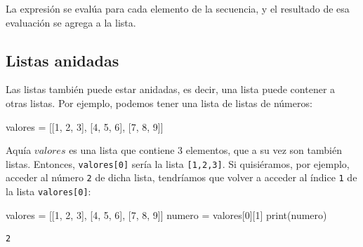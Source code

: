 \documentclass[
  letterpaper,
  DIV=11,
  numbers=noendperiod]{scrreprt}
\newenvironment{Shaded}{\begin{snugshade}}{\end{snugshade}}
\newcommand{\BuiltInTok}[1]{\textcolor[rgb]{0.00,0.23,0.31}{#1}}
\newcommand{\DecValTok}[1]{\textcolor[rgb]{0.68,0.00,0.00}{#1}}
\newcommand{\NormalTok}[1]{\textcolor[rgb]{0.00,0.23,0.31}{#1}}
\newcommand{\OperatorTok}[1]{\textcolor[rgb]{0.37,0.37,0.37}{#1}}
\begin{document}
La expresión se evalúa para cada elemento de la secuencia, y el
resultado de esa evaluación se agrega a la lista.

\hypertarget{listas-anidadas}{%
\subsection{Listas anidadas}\label{listas-anidadas}}

Las listas también puede estar anidadas, es decir, una lista puede
contener a otras listas. Por ejemplo, podemos tener una lista de listas
de números:

\begin{Shaded}
\begin{Highlighting}[]
\NormalTok{valores }\OperatorTok{=}\NormalTok{ [[}\DecValTok{1}\NormalTok{, }\DecValTok{2}\NormalTok{, }\DecValTok{3}\NormalTok{], [}\DecValTok{4}\NormalTok{, }\DecValTok{5}\NormalTok{, }\DecValTok{6}\NormalTok{], [}\DecValTok{7}\NormalTok{, }\DecValTok{8}\NormalTok{, }\DecValTok{9}\NormalTok{]]}
\end{Highlighting}
\end{Shaded}

Aquía \(valores\) es una lista que contiene 3 elementos, que a su vez
son también listas. Entonces, \texttt{valores{[}0{]}} sería la lista
\texttt{{[}1,2,3{]}}. Si quisiéramos, por ejemplo, acceder al número
\texttt{2} de dicha lista, tendríamos que volver a acceder al índice
\texttt{1} de la lista \texttt{valores{[}0{]}}:

\begin{Shaded}
\begin{Highlighting}[]
\NormalTok{valores }\OperatorTok{=}\NormalTok{ [[}\DecValTok{1}\NormalTok{, }\DecValTok{2}\NormalTok{, }\DecValTok{3}\NormalTok{], [}\DecValTok{4}\NormalTok{, }\DecValTok{5}\NormalTok{, }\DecValTok{6}\NormalTok{], [}\DecValTok{7}\NormalTok{, }\DecValTok{8}\NormalTok{, }\DecValTok{9}\NormalTok{]]}
\NormalTok{numero }\OperatorTok{=}\NormalTok{ valores[}\DecValTok{0}\NormalTok{][}\DecValTok{1}\NormalTok{]}
\BuiltInTok{print}\NormalTok{(numero)}
\end{Highlighting}
\end{Shaded}

\begin{verbatim}
2
\end{verbatim}
\end{document}
